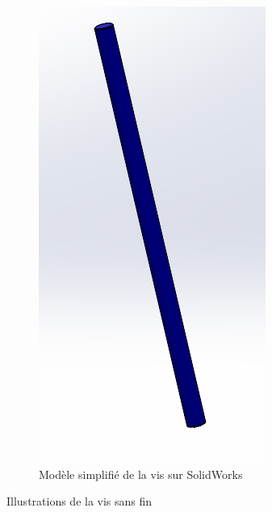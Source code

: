 \documentclass[a4paper, 11pt]{report}
\begin{document}
\begin{figure}
\begin{subfigure}[t]{0.15\textwidth}
                    \includegraphics[width=\textwidth]{Figures/vis_simplifie.png}
                    \caption{Modèle simplifié de la vis sur SolidWorks}
                \end{subfigure}
                \caption{Illustrations de la vis sans fin}
                \label{fig:vis_sans_fin}
            \end{figure}
\end{document}
